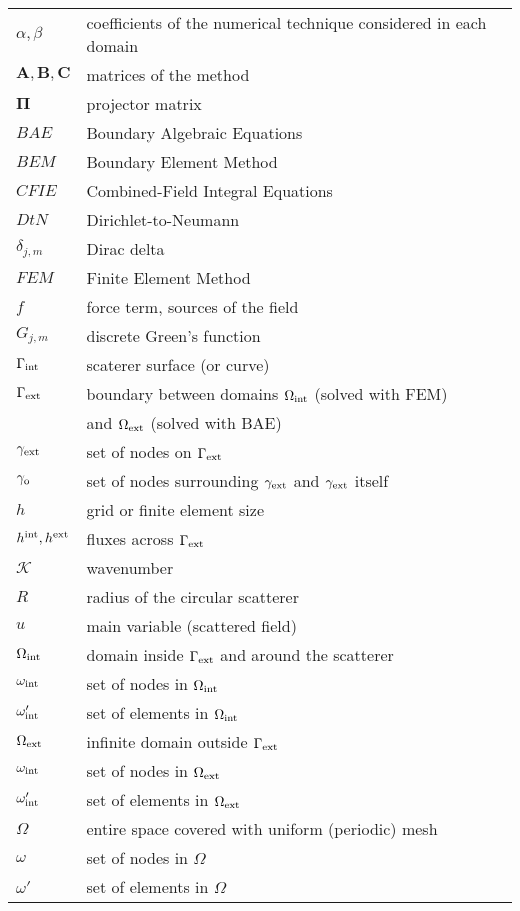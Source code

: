 \documentclass[12pt]{article}
\newcommand{\rin}{{\rm int}}
\newcommand{\rex}{{\rm ext}}
\newcommand{\K}{\mathcal{K}}
\newcommand{\A}{\mathbf{A}}
\newcommand{\B}{\mathbf{B}}
\newcommand{\C}{\mathbf{C}}
\newcommand{\matPI}{\mathbf{\Pi}}
\begin{document}
\begin{tabular}{ll}
$\alpha,\beta$ & coefficients of the numerical technique considered in each domain\\
$\A,\B,\C$ & matrices of the method \\
$\matPI$ & projector matrix \\
$BAE$ & Boundary Algebraic Equations \\
$BEM$ & Boundary Element Method \\
$CFIE$ & Combined-Field Integral Equations \\
$DtN$ & Dirichlet-to-Neumann\\
$\delta_{j,m}$ & Dirac delta \\
$FEM$ & Finite Element Method \\
$f$ & force term, sources of the field \\
$G_{j,m}$ & discrete Green's function \\
$\Gamma_\rin$ & scaterer surface (or curve) \\
$\Gamma_\rex$ & boundary between domains $\Omega_\rin$ (solved with FEM) \\
              & and $\Omega_\rex$ (solved with BAE) \\
$\gamma_\rex$ & set of nodes on $\Gamma_\rex$\\
$\gamma_{\rm o}$ & set of nodes surrounding $\gamma_\rex$ and $\gamma_\rex$ itself\\
$h$ & grid or finite element size \\
$h^\rin, h^\rex$ & fluxes across $\Gamma_\rex$\\
$\K$ & wavenumber \\
$R$ & radius of the circular scatterer \\
$u$ & main variable (scattered field) \\
$\Omega_\rin$ & domain inside $\Gamma_\rex$ and around the scatterer \\
$\omega_\rin$ & set of nodes in $\Omega_\rin$ \\
$\omega'_\rin$  & set of elements in $\Omega_\rin$ \\
$\Omega_\rex$ & infinite domain outside $\Gamma_\rex$ \\
$\omega_\rin$ & set of nodes in $\Omega_\rex$ \\
$\omega'_\rin$  & set of elements in $\Omega_\rex$ \\
$\Omega$ & entire space covered with uniform (periodic) mesh  \\
$\omega$ & set of nodes in $\Omega$ \\
$\omega'$  & set of elements in $\Omega$ \\
\end{tabular}
\end{document}
